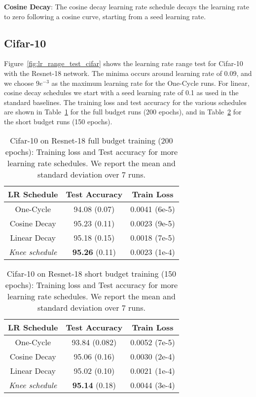 \documentclass[twoside,11pt]{article}
\newcommand{\lrschedule}{\textit{Knee schedule}}
\begin{document}
\textbf{Cosine Decay}: The cosine decay learning rate schedule decays the learning rate to zero following a cosine curve, starting from a seed learning rate.

\subsection{Cifar-10}
Figure~\ref{fig:lr_range_test_cifar}  shows the learning rate range test for Cifar-10 with the Resnet-18 network. The minima occurs around learning rate of 0.09, and we choose $9e^{-3}$ as the maximum learning rate for the One-Cycle runs. For linear, cosine decay schedules we start with a seed learning rate of 0.1 as used in the standard baselines. The training loss and test accuracy for the various schedules are shown in Table~\ref{tab:cifar_results_extra_baselines_full_budget} for the full budget runs (200 epochs), and in Table~\ref{tab:cifar_results_extra_baselines_short_budget} for the short budget runs (150 epochs).

\begin{table}[h!]
\small
\centering
\caption{Cifar-10 on Resnet-18 full budget training (200 epochs): Training loss and Test accuracy for more learning rate schedules. We report the mean and standard deviation over 7 runs.}
\label{tab:cifar_results_extra_baselines_full_budget}

\begin{tabular}{ccc}
  \toprule
  LR Schedule     & Test Accuracy  & Train Loss \\ 
  \midrule
  One-Cycle       & 94.08 (0.07)  & 0.0041 (6e-5) \\
  Cosine Decay    & 95.23 (0.11) & 0.0023 (9e-5)  \\
  Linear Decay    & 95.18 (0.15) & 0.0018 (7e-5)  \\
  \lrschedule{}   & \textbf{95.26} (0.11) & 0.0023 (1e-4)  \\ 
\bottomrule
\end{tabular}

\end{table}

\begin{table}[h!]
\small
\centering
\caption{Cifar-10 on Resnet-18 short budget training (150 epochs): Training loss and Test accuracy for more learning rate schedules. We report the mean and standard deviation over 7 runs.}
\label{tab:cifar_results_extra_baselines_short_budget}

\begin{tabular}{ccc}
  \toprule
  LR Schedule   & Test Accuracy   & Train Loss  \\ 
  \midrule
  One-Cycle     & 93.84 (0.082)    & 0.0052 (7e-5)   \\
  Cosine Decay   & 95.06 (0.16)    & 0.0030 (2e-4)\\
  Linear Decay    & 95.02 (0.10)  & 0.0021 (1e-4) \\
  \lrschedule{}   & \textbf{95.14} (0.18) & 0.0044 (3e-4)  \\ 
  \bottomrule
\end{tabular}

\end{table}
\end{document}
